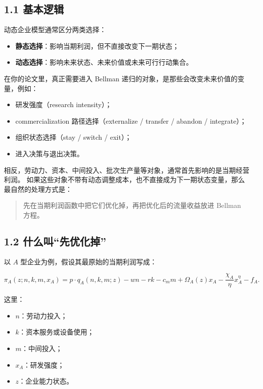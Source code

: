 \documentclass[12pt]{ctexart}
\begin{document}
\subsection{1.1 基本逻辑}

动态企业模型通常区分两类选择：

\begin{itemize}[leftmargin=2em]
    \item \textbf{静态选择}：影响当期利润，但不直接改变下一期状态；
    \item \textbf{动态选择}：影响未来状态、未来价值或未来可行行动集合。
\end{itemize}

在你的论文里，真正需要进入 Bellman 递归的对象，是那些会改变未来价值的变量，例如：

\begin{itemize}[leftmargin=2em]
    \item 研发强度（research intensity）；
    \item commercialization 路径选择（externalize / transfer / abandon / integrate）；
    \item 组织状态选择（stay / switch / exit）；
    \item 进入决策与退出决策。
\end{itemize}

相反，劳动力、资本、中间投入、批次生产量等对象，通常首先影响的是当期经营利润。
如果这些对象不带有动态调整成本，也不直接成为下一期状态变量，那么最自然的处理方式是：

\begin{quote}
先在当期利润函数中把它们优化掉，再把优化后的流量收益放进 Bellman 方程。
\end{quote}

\subsection{1.2 什么叫“先优化掉”}

以 \(A\) 型企业为例，假设其最原始的当期利润写成：

\[
\pi_A(z;n,k,m,x_A)
=
p\cdot q_A(n,k,m;z)
-wn-rk-c_m m
+\Omega_A(z)x_A
-\frac{\chi_A}{\eta}x_A^\eta
-f_A.
\]

这里：

\begin{itemize}[leftmargin=2em]
    \item \(n\)：劳动力投入；
    \item \(k\)：资本服务或设备使用；
    \item \(m\)：中间投入；
    \item \(x_A\)：研发强度；
    \item \(z\)：企业能力状态。
\end{itemize}
\end{document}
